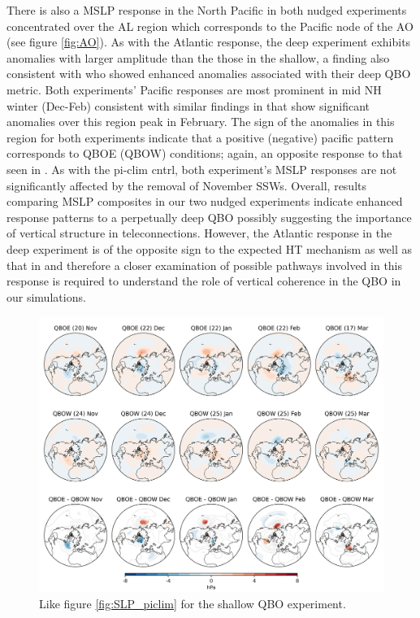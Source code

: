 There is also a MSLP response in the North Pacific in both nudged experiments concentrated over the AL region which corresponds to the Pacific node of the AO (see figure \ref{fig:AO}). As with the Atlantic response, the deep experiment exhibits anomalies with larger amplitude than the those in the shallow, a finding also consistent with \cite{andrewsObserved2019d} who showed enhanced anomalies associated with their deep QBO metric. Both experiments' Pacific responses are most prominent in mid NH winter (Dec-Feb) consistent with similar findings in \cite{graySurface2018b} that show significant anomalies over this region peak in February. The sign of the anomalies in this region for both experiments indicate that a positive (negative) pacific pattern corresponds to QBOE (QBOW) conditions; again, an opposite response to that seen in \citep{andrewsObserved2019d}. As with the pi-clim cntrl, both experiment's MSLP responses are not significantly affected by the removal of November SSWs. Overall, results comparing MSLP composites in our two nudged experiments indicate enhanced response patterns to a perpetually deep QBO possibly suggesting the importance of vertical structure in teleconnections. However, the Atlantic response in the deep experiment is of the opposite sign to the expected HT mechanism as well as that in \citep{andrewsObserved2019d} and therefore a closer examination of possible pathways involved in this response is required to understand the role of vertical coherence in the QBO in our simulations.

\begin{figure}[h!]
\begin{center}
\noindent\includegraphics[width =0.8\linewidth]{Figures/Figures-deepQBO/SLP_composites_individual_months_QBO_phases_U_s_50hPa_5thresh.png}
\caption[MSLP composites under different QBO phases in the shallow QBO simulation]{Like figure \ref{fig:SLP_piclim} for the shallow QBO experiment.}
\label{fig:SLP_shallow}
\end{center}
\end{figure}
\newpage


